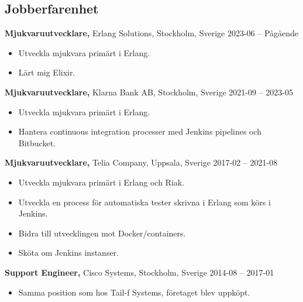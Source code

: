 \documentclass[margin]{res}
\begin{document}

\address{{\bf Kontaktinformation}\\
  
  linkedin.com/in/tommymattsson \\
  github.com/Taddic
}

\address{{\bf Adress}\\
  \\
}

\begin{resume}

\section{Jobberfarenhet}
{\bf Mjukvaruutvecklare,} Erlang Solutions, Stockholm, Sverige \hfill 2023-06 -- Pågående
 \begin{itemize} \itemsep -2pt  %
 \item Utveckla mjukvara primärt i Erlang.
 \item Lärt mig Elixir.
 \end{itemize}

{\bf Mjukvaruutvecklare,} Klarna Bank AB, Stockholm, Sverige \hfill 2021-09 -- 2023-05
 \begin{itemize} \itemsep -2pt  %
 \item Utveckla mjukvara primärt i Erlang.
 \item Hantera continuous integration processer med Jenkins pipelines och Bitbucket.
 \end{itemize}

{\bf Mjukvaruutvecklare,} Telia Company, Uppsala, Sverige \hfill 2017-02 -- 2021-08
 \begin{itemize} \itemsep -2pt  %
 \item Utveckla mjukvara primärt i Erlang och Riak.
 \item Utveckla en process för automatiska tester skrivna i Erlang som körs i Jenkins.
 \item Bidra till utvecklingen mot Docker/containers.
 \item Sköta om Jenkins instanser.
 \end{itemize}

{\bf Support Engineer,} Cisco Systems, Stockholm, Sverige \hfill 2014-08 -- 2017-01
 \begin{itemize} \itemsep -2pt  %
 \item Samma position som hos Tail-f Systems, företaget blev uppköpt.
 \end{itemize}


\end{resume}
\end{document}
